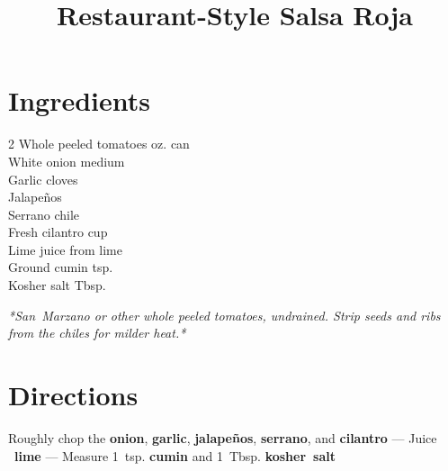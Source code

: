 \documentclass[11pt,letterpaper]{article}
\title{Restaurant-Style Salsa Roja}
\author{}
\date{}
\begin{document}
\maketitle
\thispagestyle{empty}
\vspace{-60pt}


\section*{Ingredients}
\setlength{\columnsep}{20pt}
\begin{multicols}{2}
\noindent
    Whole peeled tomatoes  oz. can \\
    White onion \dotfill {} medium \\
    Garlic cloves  \\
    Jalapeños  \\
    \columnbreak
    Serrano chile  \\
    Fresh cilantro \dotfill {} cup \\
    Lime juice \dotfill from  lime \\
    Ground cumin  tsp. \\
    Kosher salt  Tbsp.
\end{multicols}

{\small\textit{*San~Marzano or other whole peeled tomatoes, undrained. Strip seeds and ribs from the chiles for milder heat.*}}

\section*{Directions}

\noindent
Roughly chop the \textbf{onion}, \textbf{garlic}, \textbf{jalapeños}, \textbf{serrano}, and \textbf{cilantro} --- Juice ~\textbf{lime} --- Measure 1~tsp. \textbf{cumin} and 1~Tbsp. \textbf{kosher~salt}
\end{document}
